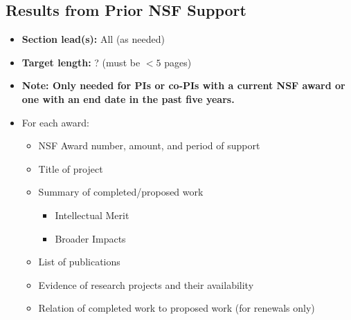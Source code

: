 \documentclass[10pt]{myNSF}
\begin{document}
\subsection{Results from Prior NSF Support}
\label{sec:prior_support}

\begin{itemize}
\item{\textbf{Section lead(s):} All (as needed)}
\item{\textbf{Target length:} ? (must be $< 5$ pages)}
\item{\textbf{Note: Only needed for PIs or co-PIs with a current NSF
      award or one with an end date in the past five years.}}
\item{For each award:}
  \begin{itemize}
  \item{NSF Award number, amount, and period of support}
  \item{Title of project}
  \item{Summary of completed/proposed work}
    \begin{itemize}
    \item{Intellectual Merit}
    \item{Broader Impacts}
    \end{itemize}
  \item{List of publications}
  \item{Evidence of research projects and their availability}
  \item{Relation of completed work to proposed work (for renewals
      only)}
  \end{itemize}
\end{itemize}
\end{document}
